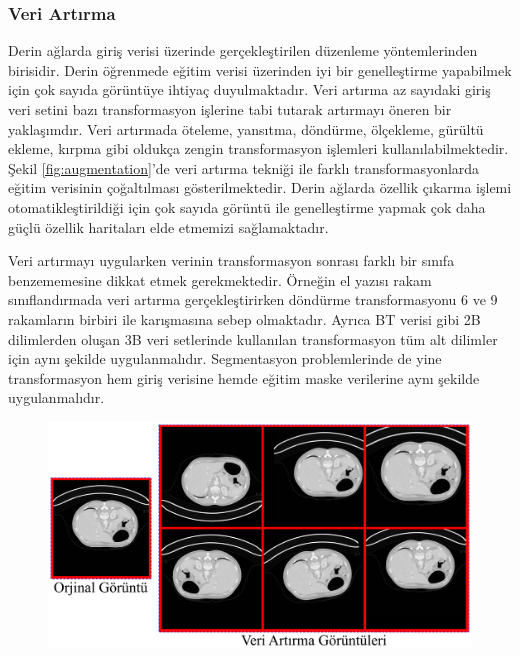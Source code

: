 \subsubsection{Veri Artırma} 
Derin ağlarda giriş verisi üzerinde gerçekleştirilen düzenleme yöntemlerinden birisidir. Derin öğrenmede eğitim verisi üzerinden iyi bir genelleştirme yapabilmek için çok sayıda görüntüye ihtiyaç duyulmaktadır. Veri artırma az sayıdaki giriş veri setini bazı transformasyon işlerine tabi tutarak artırmayı öneren bir yaklaşımdır. Veri artırmada öteleme, yansıtma, döndürme, ölçekleme, gürültü ekleme, kırpma gibi oldukça zengin transformasyon işlemleri kullanılabilmektedir. Şekil \ref{fig:augmentation}'de veri artırma tekniği ile farklı transformasyonlarda eğitim verisinin çoğaltılması gösterilmektedir. Derin ağlarda özellik çıkarma işlemi otomatikleştirildiği için çok sayıda görüntü ile genelleştirme yapmak çok daha güçlü özellik haritaları elde etmemizi sağlamaktadır. 

Veri artırmayı uygularken verinin transformasyon sonrası farklı bir sınıfa benzememesine dikkat etmek gerekmektedir. Örneğin el yazısı rakam sınıflandırmada veri artırma gerçekleştirirken döndürme transformasyonu 6 ve 9 rakamların birbiri ile karışmasına sebep olmaktadır. Ayrıca BT verisi gibi 2B dilimlerden oluşan 3B veri setlerinde kullanılan transformasyon tüm alt dilimler için aynı şekilde uygulanmalıdır. Segmentasyon problemlerinde de yine transformasyon hem giriş verisine hemde eğitim maske verilerine aynı şekilde uygulanmalıdır.

\begin{figure}[h!]
	\begin{center}
		\vspace{0.4cm}
		{
			\vspace{0.4cm}
			\includegraphics[scale=0.3]{Yapilan-Calismalar/Figures/augmentation.pdf}
		}
	\end{center}
\end{figure}

